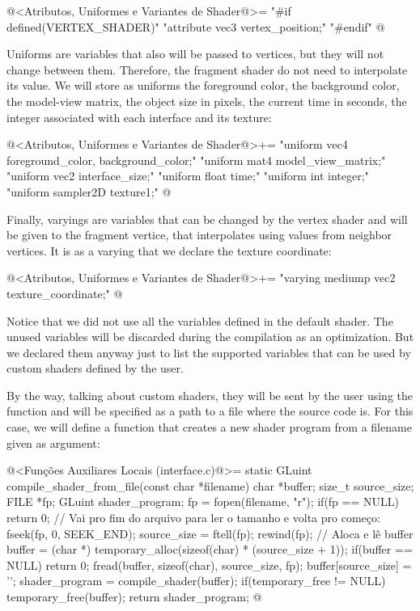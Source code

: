 \iniciocodigo
@<Atributos, Uniformes e Variantes de Shader@>=
"#if defined(VERTEX_SHADER)\n"
"attribute vec3 vertex_position;\n"
"#endif\n"
@
\fimcodigo

Uniforms are variables that also will be passed to vertices, but they
will not change between them. Therefore, the fragment shader do not
need to interpolate its value. We will store as uniforms the
foreground color, the background color, the model-view matrix, the
object size in pixels, the current time in seconds, the integer
associated with each interface and its texture:

\iniciocodigo
@<Atributos, Uniformes e Variantes de Shader@>+=
"uniform vec4 foreground_color, background_color;\n"
"uniform mat4 model_view_matrix;\n"
"uniform vec2 interface_size;\n"
"uniform float time;\n"
"uniform int integer;\n"
"uniform sampler2D texture1;\n"
@
\fimcodigo

Finally, varyings are variables that can be changed by the vertex
shader and will be given to the fragment vertice, that interpolates
using values from neighbor vertices. It is as a varying that we
declare the texture coordinate:

\iniciocodigo
@<Atributos, Uniformes e Variantes de Shader@>+=
"varying mediump vec2 texture_coordinate;\n"
@
\fimcodigo

Notice that we did not use all the variables defined in the default
shader. The unused variables will be discarded during the compilation
as an optimization. But we declared them anyway just to list the
supported variables that can be used by custom shaders defined by the
user.

By the way, talking about custom shaders, they will be sent by the
user using the function  and will be
specified as a path to a file where the source code is. For this case,
we will define a function that creates a new shader program from a
filename given as argument:

\iniciocodigo
@<Funções Auxiliares Locais (interface.c)@>=
static GLuint compile_shader_from_file(const char *filename){
  char *buffer;
  size_t source_size;
  FILE *fp;
  GLuint shader_program;
  fp = fopen(filename, "r");
  if(fp == NULL)  return 0;
  // Vai pro fim do arquivo para ler o tamanho e volta pro começo:
  fseek(fp, 0, SEEK_END);
  source_size = ftell(fp);
  rewind(fp);
  // Aloca e lê buffer
  buffer = (char *) temporary_alloc(sizeof(char) * (source_size + 1));
  if(buffer == NULL) return 0;
  fread(buffer, sizeof(char), source_size, fp);
  buffer[source_size] = '\0';
  shader_program = compile_shader(buffer);
  if(temporary_free != NULL) temporary_free(buffer);
  return shader_program;
}
@
\fimcodigo


